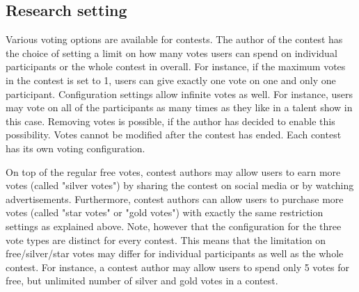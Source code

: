 \subsection{Research setting}
    
    


    Various voting options are available for contests. The author of the contest has the choice of setting a limit on how many votes users can spend on individual participants or the whole contest in overall. For instance, if the maximum votes in the contest is set to 1, users can give exactly one vote on one and only one participant. Configuration settings allow infinite votes as well. For instance, users may vote on all of the participants as many times as they like in a talent show in this case. Removing votes is possible, if the author has decided to enable this possibility. Votes cannot be modified after the contest has ended. Each contest has its own voting configuration. 
    
    On top of the regular free votes, contest authors may allow users to earn more votes (called "silver votes") by sharing the contest on social media or by watching advertisements. Furthermore, contest authors can allow users to purchase more votes (called "star votes" or "gold votes") with exactly the same restriction settings as explained above. Note, however that the configuration for the three vote types are distinct for every contest. This means that the limitation on free/silver/star votes may differ for individual participants as well as the whole contest. For instance, a contest author may allow users to spend only 5 votes for free, but unlimited number of silver and gold votes in a contest.

